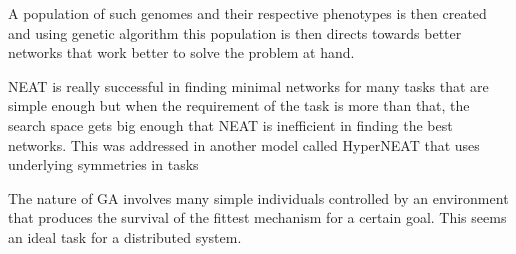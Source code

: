 \documentclass[twocolumn]{article}
\begin{document}
A population of such genomes and their respective 
phenotypes is then created and using genetic algorithm
this population is then directs towards better networks
that work better to solve the problem at hand.

NEAT is really successful in finding minimal networks
for many tasks that are simple enough but when the
requirement of the task is more than that, the search 
space gets big enough that NEAT is inefficient in
finding the best networks. This was addressed in 
another model called HyperNEAT \cite{originalHyperNEAT}
that uses underlying symmetries in tasks 

The nature of GA involves many simple individuals 
controlled by an environment that produces the 
survival of the fittest mechanism for a certain goal.
This seems an ideal task for a distributed system.




\end{document}
